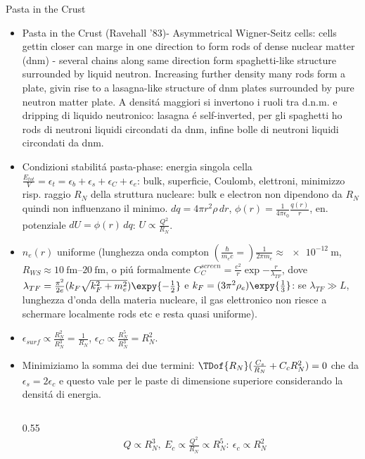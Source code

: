 \begin{frame}{Pasta in the Crust}
    \begin{itemize}
        \item Pasta in the Crust (Ravehall '83)- Asymmetrical Wigner-Seitz cells: cells gettin closer can marge in one direction to form rods of dense nuclear matter (dnm) - several chains along same direction form spaghetti-like structure surrounded by liquid neutron. Increasing further density many rods form a plate, givin rise to a lasagna-like structure of dnm plates surrounded by pure neutron matter plate. A densit\'a maggiori si invertono i ruoli tra d.n.m. e dripping di liquido neutronico: lasagna \'e self-inverted, per gli spaghetti ho rods di neutroni liquidi circondati da dnm, infine bolle di neutroni liquidi circondati da dnm.
        \item Condizioni stabilit\'a pasta-phase: energia singola cella $\frac{E_{tot}}{V}=\epsilon_t=\epsilon_b+\epsilon_s+\epsilon_C+\epsilon_e$: bulk, superficie, Coulomb, elettroni, minimizzo risp. raggio $R_N$ della struttura nucleare: bulk e electron non dipendono da $R_N$ quindi non influenzano il minimo. $dq=4\pi r^2\rho\,dr$, $\phi(r)=\frac{1}{4\pi\epsilon_0}\frac{q(r)}{r}$, en. potenziale $dU=\phi(r)\,dq$: $U\propto \frac{Q^2}{R_N}$.
        \item $n_e(r)$ uniforme (lunghezza onda compton $(\frac{\hbar}{m_ec}=)\frac{1}{2\pi m_e}\approx\SI{e-12}{\meter}$, $R_{WS}\approx\SIrange{10}{20}{\femto\meter}$, o pi\'u formalmente $C_C^{screen}=\frac{e^2}{r}\exp{-\frac{r}{\lambda_{TF}}}$, dove $\lambda_{TF}=\frac{\pi^2}{2e}(k_F\sqrt{k_F^2+m_e^2})\expy{-\frac{1}{2}}$ e $k_F=(3\pi^2\rho_e)\expy{\frac{1}{3}}$: se $\lambda_{TF}\gg L$, lunghezza d'onda della materia nucleare, il gas elettronico non riesce a schermare localmente rods etc e resta quasi uniforme).
        \item $\epsilon_{surf}\propto \frac{R_N^2}{R_N^3}=\frac{1}{R_N}$, $\epsilon_C\propto \frac{R_N^5}{R_N^3}=R_N^2$.
        \item Minimiziamo la somma dei due termini: $\TDof{R_N}(\frac{C_s}{R_N}+C_cR_N^2)=0$ che da $\epsilon_s=2\epsilon_c$ e questo vale per le paste di dimensione superiore considerando la densit\'a di energia.
            \begin{columns}[T]
                \begin{column}{0.55\textwidth}
\begin{align*}
& Q \propto R_N^3,\ E_c\propto\frac{Q^2}{R_N}\propto R_N^5:\ \epsilon_c\propto R_N^2\tag{sfera}\\

\end{align*}
\end{column}
\end{columns}
\end{itemize}
\end{frame}
